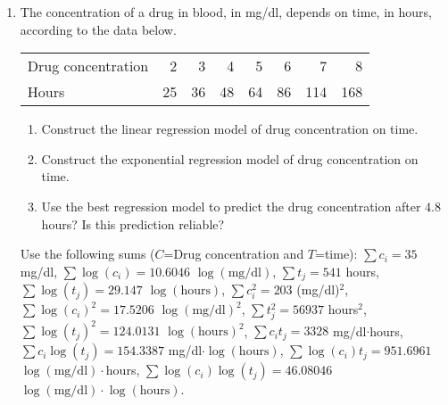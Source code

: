 \begin{enumerate}[leftmargin=*,resume]
\item The concentration of a drug in blood, in mg/dl, depends on time, in hours, according to the data below.
\begin{center}
\begin{tabular}{lrrrrrrr}
\toprule
Drug concentration & 2 & 3 & 4 & 5 & 6 & 7 & 8\\
Hours & 25 & 36 & 48 & 64 & 86 & 114 & 168\\
\bottomrule
\end{tabular}
\end{center}
\begin{enumerate}
\item Construct the linear regression model of drug concentration on time. 
\item Construct the exponential regression model of drug concentration on time. 
\item Use the best regression model to predict the drug concentration after $4.8$ hours? Is this prediction reliable?
\end{enumerate}

Use the following sums ($C$=Drug concentration and $T$=time): $\sum c_i=35$ mg/dl, $\sum \log(c_i)=10.6046$
$\log(\mbox{mg/dl})$, $\sum t_j=541$ hours, $\sum \log(t_j)= 29.147$ $\log(\mbox{hours})$, $\sum c_i^2=203$ (mg/dl)$^2$,
$\sum \log(c_i)^2=17.5206$ $\log(\mbox{mg/dl})^2$, $\sum t_j^2=56937$ hours$^2$, $\sum \log(t_j)^2=124.0131$
$\log(\mbox{hours})^2$, $\sum c_it_j=3328$ mg/dl$\cdot$hours, $\sum c_i\log(t_j)=154.3387$
mg/dl$\cdot\log(\mbox{hours})$, $\sum \log(c_i)t_j=951.6961$ $\log(\mbox{mg/dl})\cdot$hours, $\sum
\log(c_i)\log(t_j)=46.08046$ $\log(\mbox{mg/dl})\cdot\log(\mbox{hours})$.


\end{enumerate}
